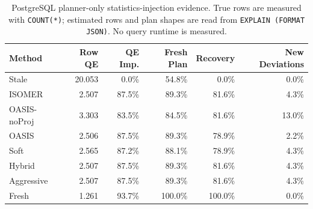 \begin{table}[t]
  \centering
  \small
  \caption{PostgreSQL planner-only statistics-injection evidence. True rows are measured with \texttt{COUNT(*)}; estimated rows and plan shapes are read from \texttt{EXPLAIN (FORMAT JSON)}. No query runtime is measured.}
  \label{tab:postgres_planner_stats_injection}
  \setlength{\tabcolsep}{4pt}
  \begin{tabular}{lrrrrr}
    \toprule
    Method & Row QE & QE Imp. & Fresh Plan & Recovery & New Deviations \\
    \midrule
    Stale & 20.053 & 0.0\% & 54.8\% & 0.0\% & 0.0\% \\
    ISOMER & 2.507 & 87.5\% & 89.3\% & 81.6\% & 4.3\% \\
    OASIS-noProj & 3.303 & 83.5\% & 84.5\% & 81.6\% & 13.0\% \\
    OASIS & 2.506 & 87.5\% & 89.3\% & 78.9\% & 2.2\% \\
    Soft & 2.565 & 87.2\% & 88.1\% & 78.9\% & 4.3\% \\
    Hybrid & 2.507 & 87.5\% & 89.3\% & 81.6\% & 4.3\% \\
    Aggressive & 2.507 & 87.5\% & 89.3\% & 81.6\% & 4.3\% \\
    Fresh & 1.261 & 93.7\% & 100.0\% & 100.0\% & 0.0\% \\
    \bottomrule
  \end{tabular}
\end{table}
